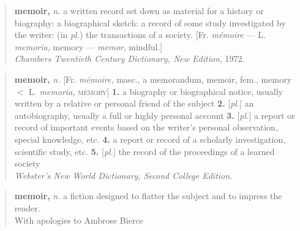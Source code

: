 \documentclass[10pt,letterpaper,extrafontsizes]{memoir}
\begin{document}
\endgroup

\clearpage
\vspace*{\fill}
\begin{quote}
\textbf{memoir,} \textit{n.} a written record set down as material
  for a history or biography: 
  a biographical sketch:
  a record of some study investigated by the writer:
  (in \textit{pl.}) the transactions of a society.
  [Fr. \textit{m\'{e}moire} --- L. \textit{memoria,} memory ---
   \textit{memor}, mindful.] \\[0.5\baselineskip]
  \hspace*{\fill} 
      \textit{Chambers Twentieth Century Dictionary, New Edition}, 1972.
\end{quote}

\vspace{2\baselineskip}

\begin{quote}
\textbf{memoir,} \textit{n.} [Fr. \textit{m\'{e}moire,} masc., a memorandum,
    memoir, fem., memory $<$ L. \textit{memoria,} \textsc{memory}]
  \hspace{1ex} \textbf{1.} a biography or biographical notice, 
      usually written by a relative or personal friend of the subject 
  \hspace{1ex} \textbf{2.} [\textit{pl.}] an autobiography, 
      usually a full or highly personal account
  \hspace{1ex} \textbf{3.} [\textit{pl.}] a report or record of 
      important events based on the writer's personal observation, 
      special knowledge, etc.
  \hspace{1ex} \textbf{4.} a report or record of a scholarly 
      investigation, scientific study, etc.
  \hspace{1ex} \textbf{5.} [\textit{pl.}] the record of the proceedings
      of a learned society \\[0.5\baselineskip]
  \hspace*{\fill} \textit{Webster's New World Dictionary, Second College Edition}.
\end{quote}

\vspace{2\baselineskip}


\begin{quote}
\textbf{memoir,} \textit{n.} a fiction designed to flatter the subject 
  and to impress the reader. \\[0.5\baselineskip]
\hspace*{\fill} With apologies to Ambrose Bierce %
\end{quote}
\end{document}
